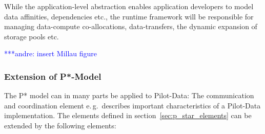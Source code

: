 \documentclass[conference,final]{IEEEtran}
\newcommand{\alnote}[1]{ {\textcolor{blue} { ***andre: #1 }}}
\newcommand{\alnote}[1]{}
\begin{document}
While the application-level abstraction enables application developers to model 
data affinities, dependencies etc., the runtime framework will be responsible 
for managing data-compute co-allocations, data-transfers, the dynamic expansion of storage pools etc. 

\alnote{insert Millau figure}

\subsubsection{Extension of P*-Model}

The P* model can in many parts be applied to Pilot-Data: The communication and
coordination element e.\,g.\ describes important characteristics of a Pilot-Data
implementation. The elements defined in section~\ref{sec:p_star_elements} can be
extended by the following elements:
\end{document}
